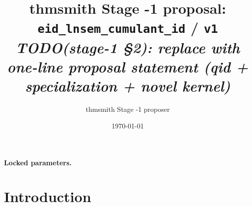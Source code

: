 \documentclass[11pt]{article}
\title{thmsmith Stage -1 proposal: \texttt{eid\_lnsem\_cumulant\_id} / \texttt{v1}%
  \\ \large\textit{TODO(stage-1 \S2): replace with one-line proposal statement (qid + specialization + novel kernel)}}
\author{thmsmith Stage -1 proposer}
\date{\today}
\theoremstyle{definition}
\theoremstyle{plain}
\theoremstyle{remark}
\begin{document}
\maketitle


\paragraph{Locked parameters.}

\begin{abstract}
\end{abstract}

\section{Introduction}
%
%
%
%
\end{document}
